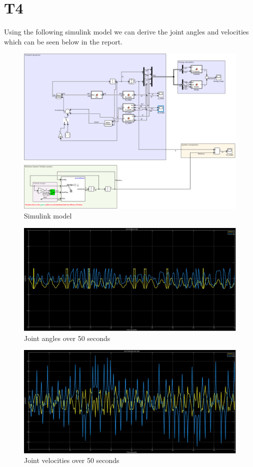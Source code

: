 \documentclass[12pt]{article}
\begin{document}
\section{T4}
Using the following simulink model we can derive the joint angles and velocities which can be seen below in the report.
\begin{figure}[H]
	\centering
	\includegraphics[scale=0.6]{simulinkmodel}
	\caption{Simulink model}
	\label{fig:model}
\end{figure}

\begin{figure}[H]
	\centering
	\includegraphics[scale=0.25]{Joint angles}
	\caption{Joint angles over 50 seconds}
\end{figure}

\begin{figure}[H]
	\centering
	\includegraphics[scale=0.25]{Joint velocities}
	\caption{Joint velocities over 50 seconds}
\end{figure}
\end{document}
